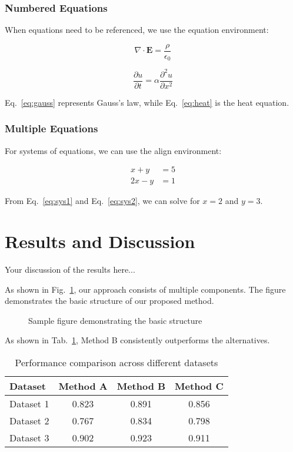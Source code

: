 \documentclass{site-conf}
\begin{document}
\subsubsection{Numbered Equations}
When equations need to be referenced, we use the equation environment:

\begin{equation}
  \nabla \cdot \mathbf{E} = \frac{\rho}{\epsilon_0}
  \label{eq:gauss}
\end{equation}

\begin{equation}
  \frac{\partial u}{\partial t} = \alpha \frac{\partial^2 u}{\partial x^2}
  \label{eq:heat}
\end{equation}

Eq.~\ref{eq:gauss} represents Gauss's law, while Eq.~\ref{eq:heat} is
the heat equation.

\subsubsection{Multiple Equations}
For systems of equations, we can use the align environment:

\begin{align}
  x + y &= 5 \label{eq:sys1} \\
  2x - y &= 1 \label{eq:sys2}
\end{align}

From Eq.~\ref{eq:sys1} and Eq.~\ref{eq:sys2}, we can solve for $x =
2$ and $y = 3$.

\section{Results and Discussion}
Your discussion of the results here...

As shown in Fig.~\ref{fig:sample}, our approach consists of multiple
components. The figure demonstrates the basic structure of our proposed method.

\begin{figure}[htbp]
  \centering
  \caption{Sample figure demonstrating the basic structure}
  \label{fig:sample}
\end{figure}

As shown in Tab.~\ref{tab:comparison}, Method B consistently outperforms the
alternatives.

\begin{table}[htbp]
  \centering
  \caption{Performance comparison across different datasets}
  \label{tab:comparison}
  \begin{tabular}{lccc}
    \hline
    Dataset & Method A & Method B & Method C \\
    \hline
    Dataset 1 & 0.823 & 0.891 & 0.856 \\
    Dataset 2 & 0.767 & 0.834 & 0.798 \\
    Dataset 3 & 0.902 & 0.923 & 0.911 \\
    \hline
  \end{tabular}
\end{table}
\end{document}
